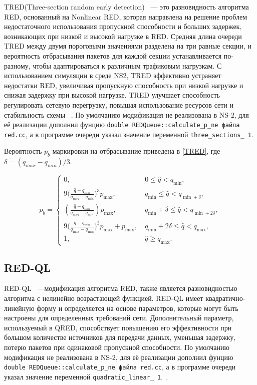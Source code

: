 TRED(Three-section random early detection) ~--- это разновидность алгоритма RED, основанный на Nonlinear RED, 
которая направлена на решение проблем недостаточного использования пропускной способности и больших задержек, 
возникающих при низкой и высокой нагрузке в RED. Средняя длина очереди TRED между двумя пороговыми значениями 
разделена на три равные секции, и вероятность отбрасывания пакетов для каждой секции устанавливается по-разному, 
чтобы адаптироваться к различным трафиковым нагрузкам. С использованием симуляции в среде NS2, TRED эффективно 
устраняет недостатки RED, увеличивая пропускную способность при низкой нагрузке и снижая задержку при высокой нагрузке. 
TRED улучшает способность регулировать сетевую перегрузку, повышая использование ресурсов сети и стабильность схемы ~\cite{TRED}. 
По умолчанию модификация не реализована в NS-2, для её реализации дополнил фунцию \verb|double REDQueue::calculate_p_ne файла red.cc|, 
а в программе очереди указал значение переменной \verb|three_sections_ 1|. 

Вероятность $p_{b}$ маркировки на отбрасывание приведена в \eqref{TRED}, где $ \delta = (q_{max} - q_{min})/3 $.

\begin{equation}
\label{TRED}
p_{b} = \begin{cases}
        0, &  \ 0 \leqslant \hat{q} < q_{\min},
        \\
        9({\frac{\hat{q} - q_{\min}}{q_{\max} - q_{\min}})^3} {p_{\max}}, & \ q_{\min} \leqslant  \hat{q} < q_{\min + \delta},
        \\
        (\frac{\hat{q} - q_{\min}}{q_{\max} - q_{\min}}) {p_{\max}}, & \ q_{\min} + \delta \leqslant \hat{q} < q_{\min + 2\delta},
        \\
        9({\frac{\hat{q} - q_{\min}}{q_{\max} - q_{\min}})^3} {p_{\max}} + {p_{\max}}, & \ q_{\min} +2\delta \leqslant  \hat{q} < q_{\max},
        \\
        1, &  \ \hat{q} \geqslant q_{\max}.
\end{cases}
\end{equation} 


\subsection{RED-QL}

RED-QL ~---модификация алгоритма RED, также является разновидностью алгоритма с нелинейно возрастающей функцией. 
RED-QL имеет квадратично-линейную форму и определяется на основе параметров, 
которые могут быть настроены для определенных требований сети\cite{REDQL}. Дополнительный параметр, 
используемый в QRED, способствует повышению его эффективности при большом количестве источников для передачи данных, уменьшая задержку,
потерю пакетов при одинаковой пропускной способности.   
По умолчанию модификация не реализована в NS-2, для её реализации дополнил фунцию 
\verb|double REDQueue::calculate_p_ne файла red.cc|, а в программе очереди указал значение переменной \verb|quadratic_linear_ 1|. . 


